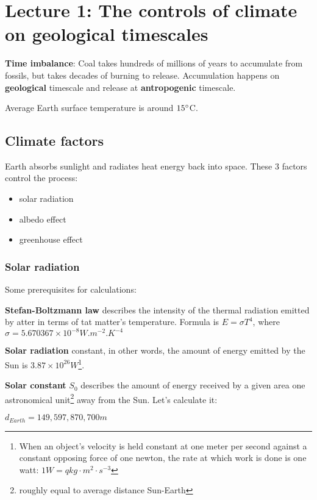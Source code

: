\section{Lecture 1: The controls of climate on geological timescales}


\textbf{Time imbalance}: Coal takes hundreds of millions of years to accumulate
from fossils, but takes decades of burning to release. Accumulation happens on
\textbf{geological} timescale and release at \textbf{antropogenic} timescale.

Average Earth surface temperature is around $15 \degree$C.

\subsection{Climate factors}
Earth absorbs sunlight and radiates heat energy back into space.
These 3 factors control the process:
\begin{itemize}
	\item solar radiation
	\item albedo effect
	\item greenhouse effect
\end{itemize}

\subsubsection*{Solar radiation}

Some prerequisites for calculations:

\textbf{Stefan-Boltzmann law} describes the intensity of the thermal radiation
emitted by atter in terms of tat matter's temperature. Formula is
$E = \sigma T^4$, where
$\sigma = 5.670367 \times 10^{-8}W.m^{-2}.K^{-4}$

\textbf{Solar radiation} constant, in other words, the amount of energy emitted
by the Sun is $3.87 \times 10^{26}W$\footnote{
	When an object's velocity is held constant at one meter per second
	against a constant opposing force of one newton, the rate at which
	work is done is one watt: $1W = q kg \cdot m^2 \cdot s^{-3}$
}.

\textbf{Solar constant} $S_0$ describes the amount of energy received by a
given area one astronomical unit\footnote{roughly equal to average distance
Sun-Earth} away from the Sun. Let's calculate it:

$d_{Earth} = 149,597,870,700m$

